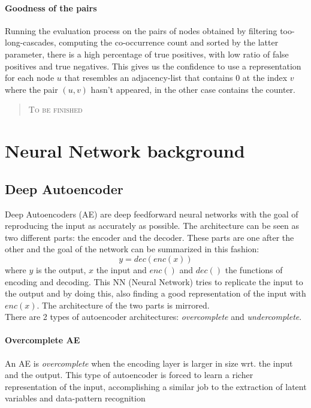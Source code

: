 \documentclass{article}
\begin{document}
			\paragraph{Goodness of the pairs}
			Running the evaluation process on the pairs of nodes obtained by filtering too-long-cascades, computing the co-occurrence count and sorted by the latter parameter, there is a high percentage of true positives, with low ratio of false positives and true negatives. This gives us the confidence to use a representation for each node $u$ that resembles an adjacency-list that contains 0 at the index $v$ where the pair $(u,v)$ hasn't appeared, in the other case contains the counter.\\
			\begin{quote}
				\centering
				\textsc{To be finished}\\
			\end{quote}
			\newpage
			
		\section{Neural Network background}
			\subsection{Deep Autoencoder}
			Deep Autoencoders (AE) are deep feedforward neural networks with the goal of reproducing the input as accurately as possible. The architecture can be seen as two different parts: the encoder and the decoder. These parts are one after the other and the goal of the network can be summarized in this fashion:
			$$y=dec(enc(x))$$
			where $y$ is the output, $x$ the input and $enc()$ and $dec()$ the functions of encoding and decoding. This NN (Neural Network) tries to replicate the input to the output and by doing this, also finding a good representation of the input with $enc(x)$. The architecture of the two parts is mirrored.\\
			There are 2 types of autoencoder architectures: \textit{overcomplete} and \textit{undercomplete}.
			\paragraph{Overcomplete AE}
			An AE is \textit{overcomplete} when the encoding layer is larger in size wrt. the input and the output. This type of autoencoder is forced to learn a richer representation of the input, accomplishing a similar job to the extraction of latent variables and data-pattern recognition
\end{document}
